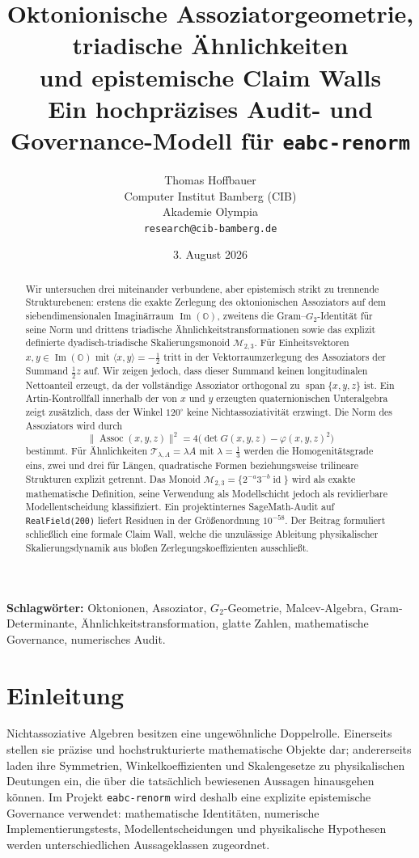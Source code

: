 \documentclass[11pt,a4paper]{article}
\title{\textbf{Oktonionische Assoziatorgeometrie, triadische Ähnlichkeiten\\
und epistemische Claim Walls}\\[0.4em]
\large Ein hochpräzises Audit- und Governance-Modell für \texttt{eabc-renorm}}
\author{
Thomas Hoffbauer\\
Computer Institut Bamberg (CIB)\\
Akademie Olympia\\
\texttt{research@cib-bamberg.de}
}
\date{3. August 2026}
\theoremstyle{definition}
\newcommand{\ImO}{\operatorname{Im}(\mathbb O)}
\newcommand{\Assoc}{\operatorname{Assoc}}
\newcommand{\MtwoThree}{\mathcal M_{2,3}}
\newcommand{\id}{\operatorname{id}}
\begin{document}
\maketitle

\begin{abstract}
Wir untersuchen drei miteinander verbundene, aber epistemisch strikt zu trennende Strukturebenen: erstens die exakte Zerlegung des oktonionischen Assoziators auf dem siebendimensionalen Imaginärraum $\ImO$, zweitens die Gram--$G_2$-Identität für seine Norm und drittens triadische Ähnlichkeitstransformationen sowie das explizit definierte dyadisch-triadische Skalierungsmonoid $\MtwoThree$. Für Einheitsvektoren $x,y\in\ImO$ mit $\langle x,y\rangle=-\tfrac12$ tritt in der Vektorraumzerlegung des Assoziators der Summand $\tfrac12 z$ auf. Wir zeigen jedoch, dass dieser Summand keinen longitudinalen Nettoanteil erzeugt, da der vollständige Assoziator orthogonal zu $\operatorname{span}\{x,y,z\}$ ist. Ein Artin-Kontrollfall innerhalb der von $x$ und $y$ erzeugten quaternionischen Unteralgebra zeigt zusätzlich, dass der Winkel $120^\circ$ keine Nichtassoziativität erzwingt. Die Norm des Assoziators wird durch
\[
\|\Assoc(x,y,z)\|^2
=
4\bigl(\det G(x,y,z)-\varphi(x,y,z)^2\bigr)
\]
bestimmt. Für Ähnlichkeiten $\mathcal T_{\lambda,A}=\lambda A$ mit $\lambda=\tfrac13$ werden die Homogenitätsgrade eins, zwei und drei für Längen, quadratische Formen beziehungsweise trilineare Strukturen explizit getrennt. Das Monoid $\MtwoThree=\{2^{-a}3^{-b}\id\}$ wird als exakte mathematische Definition, seine Verwendung als Modellschicht jedoch als revidierbare Modellentscheidung klassifiziert. Ein projektinternes SageMath-Audit auf \texttt{RealField(200)} liefert Residuen in der Größenordnung $10^{-58}$. Der Beitrag formuliert schließlich eine formale Claim Wall, welche die unzulässige Ableitung physikalischer Skalierungsdynamik aus bloßen Zerlegungskoeffizienten ausschließt.
\end{abstract}

\noindent\textbf{Schlagwörter:}
Oktonionen, Assoziator, $G_2$-Geometrie, Malcev-Algebra, Gram-Determinante,
Ähnlichkeitstransformation, glatte Zahlen, mathematische Governance,
numerisches Audit.

\section{Einleitung}

Nichtassoziative Algebren besitzen eine ungewöhnliche Doppelrolle. Einerseits stellen sie präzise und hochstrukturierte mathematische Objekte dar; andererseits laden ihre Symmetrien, Winkelkoeffizienten und Skalengesetze zu physikalischen Deutungen ein, die über die tatsächlich bewiesenen Aussagen hinausgehen können. Im Projekt \texttt{eabc-renorm} wird deshalb eine explizite epistemische Governance verwendet: mathematische Identitäten, numerische Implementierungstests, Modellentscheidungen und physikalische Hypothesen werden unterschiedlichen Aussageklassen zugeordnet.
\end{document}
